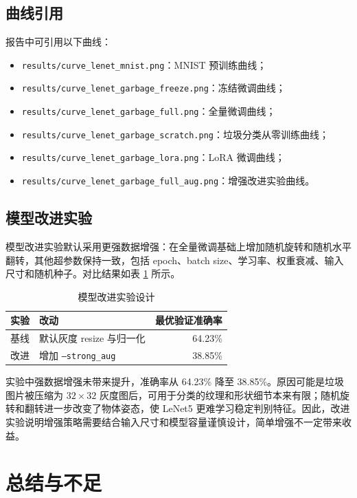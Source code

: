 \documentclass[UTF8,a4paper,zihao=-4]{ctexbook}
\begin{document}
\section{曲线引用}

报告中可引用以下曲线：

\begin{itemize}
    \item \texttt{results/curve\_lenet\_mnist.png}：MNIST 预训练曲线；
    \item \texttt{results/curve\_lenet\_garbage\_freeze.png}：冻结微调曲线；
    \item \texttt{results/curve\_lenet\_garbage\_full.png}：全量微调曲线；
    \item \texttt{results/curve\_lenet\_garbage\_scratch.png}：垃圾分类从零训练曲线；
    \item \texttt{results/curve\_lenet\_garbage\_lora.png}：LoRA 微调曲线；
    \item \texttt{results/curve\_lenet\_garbage\_full\_aug.png}：增强改进实验曲线。
\end{itemize}

\section{模型改进实验}

模型改进实验默认采用更强数据增强：在全量微调基础上增加随机旋转和随机水平翻转，其他超参数保持一致，包括 epoch、batch size、学习率、权重衰减、输入尺寸和随机种子。对比结果如表 \ref{tab:improve} 所示。

\begin{table}[H]
\centering
\caption{模型改进实验设计}
\label{tab:improve}
\begin{tabular}{llr}
\toprule
实验 & 改动 & 最优验证准确率 \\
\midrule
基线 & 默认灰度 resize 与归一化 & 64.23\% \\
改进 & 增加 \texttt{--strong\_aug} & 38.85\% \\
\bottomrule
\end{tabular}
\end{table}

实验中强数据增强未带来提升，准确率从 64.23\% 降至 38.85\%。原因可能是垃圾图片被压缩为 $32 \times 32$ 灰度图后，可用于分类的纹理和形状细节本来有限；随机旋转和翻转进一步改变了物体姿态，使 LeNet5 更难学习稳定判别特征。因此，改进实验说明增强策略需要结合输入尺寸和模型容量谨慎设计，简单增强不一定带来收益。

\chapter{总结与不足}
\end{document}
